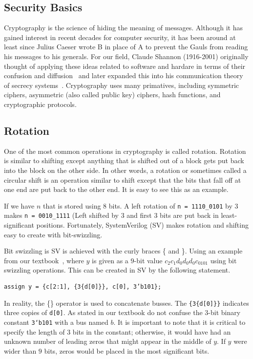 \documentclass{article}
\begin{document}
\subsection{Security Basics}

Cryptography is the science of hiding the meaning of
messages. Although it has gained interest in recent decades for
computer security, it has been around at least since Julius Caeser
wrote B in place of A to prevent the Gauls from reading his messages
to his generals.
For our field, Claude Shannon (1916-2001) originally thought of
applying these ideas related to software and hardare in terms
of their confusion and diffusion~\cite{shannon1} and later expanded this
into his communication theory of secrecy systems~\cite{6769090}.
Cryptography uses many primatives, including symmetric ciphers,
asymmetric (also called public key) ciphers, hash functions, and
cryptographic protocols.


\subsection{Rotation}
\label{swizzle.sec}

One of the most common operations in cryptography is called rotation.
Rotation is similar to shifting except anything that is shifted out of
a block gets put back into the block on the other side.  In other
words, a rotation or sometimes called a circular shift is an operation
similar to shift except that the bits that fall off at one end are put
back to the other end.  It is easy to see this as an example.

If we have $n$ that is stored using $8$ bits.
A left rotation of \verb!n = 1110_0101! by $3$ makes
\verb!n = 0010_1111! (Left shifted by 3 and first 3 bits are put back
in least-significant positions.  Fortunately, SystemVerilog (SV) makes
rotation and shifting easy to create with bit-swizzling.

Bit swizzling is SV is achieved with the curly braces \{ and \}.
Using an example from our textbook~\cite{ddca-riscv}, where $y$ is
given as a $9$-bit value
$c_2c_1d_0d_0d_0c_0101$ using bit swizzling operations.  This can be
created in SV by the following statement.
\begin{verbatim}
assign y = {c[2:1], {3{d[0]}}, c[0], 3’b101};
\end{verbatim}
In reality, the \{\} operator is used to concatenate busses. The
\verb!{3{d[0]}}! indicates three copies of \verb!d[0]!.
As stated in our textbook do not confuse the $3$-bit binary constant
\verb!3‘b101! with a bus named $b$.
It is important to note that it is critical to specify the length of
$3$ bits in the constant; otherwise, it would have had an unknown
number of leading zeros that might appear in the middle of $y$.
If $y$ were wider than $9$ bits, zeros would be placed in the most
significant bits.
\end{document}
